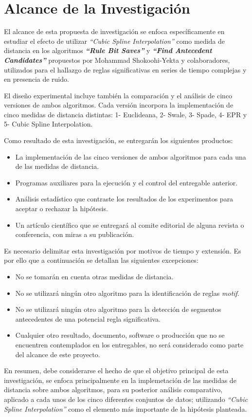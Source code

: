 \section{\textbf{Alcance de la Investigaci\'on}}
El alcance de esta propuesta de investigaci\'on se enfoca espec\'ificamente en estudiar el efecto de utilizar \textit{\enquote{Cubic Spline Interpolation}} como medida de distancia en los algoritmos \textit{\textbf{\enquote{Rule Bit Saves}}} y \textit{\textbf{\enquote{Find Antecedent Candidates}}} propuestos por Mohammad Shokoohi-Yekta y colaboradores, utilizados para el hallazgo de reglas significativas en series de tiempo complejas y en presencia de ruido.\par
El dise\~no experimental incluye tambi\'en la comparaci\'on y el an\'alisis de cinco versiones de ambos algoritmos. Cada versi\'on incorpora la implementaci\'on de cinco medidas de distancia distintas: 1- Euclideana, 2- Swale, 3- Spade, 4- EPR y 5- Cubic Spline Interpolation.\par
Como resultado de esta investigaci\'on, se entregar\'an los siguientes productos:
\begin{itemize}
\item La implementaci\'on de las cinco versiones de ambos algoritmos para cada una de las medidas de distancia.
\item Programas auxiliares para la ejecuci\'on y el control del entregable anterior.
\item An\'alisis estad\'istico que contraste los resultados de los experimentos para aceptar o rechazar la hip\'otesis.
\item Un art\'iculo cient\'ifico que se entregar\'a al comite editorial de alguna revista o conferencia, con miras a su publicaci\'on.
\end{itemize}
\par
Es necesario delimitar esta investigaci\'on por motivos de tiempo y extensi\'on. Es por ello que a continuaci\'on se detallan las siguientes excepciones:
\begin{itemize}
\item No se tomar\'an en cuenta otras medidas de distancia.
\item No se utilizar\'a ning\'un otro algoritmo para la identificaci\'on de reglas \textit{motif}.
\item No se utilizar\'a ning\'un otro algoritmo para la detecci\'on de segmentos antecedentes de una potencial regla significativa.
\item Cualquier otro resultado, documento, software o producci\'on que no se encuentren contemplados en los entregables, no ser\'a considerado como parte del alcance de este proyecto.
\end{itemize}
En resumen, debe considerarse el hecho de que el objetivo principal de esta investigaci\'on, se enfoca principalmente en la implemetaci\'on de las medidas de distancia sobre ambos algoritmos, para su posterior an\'alisis comparativo, aplicado a cada unos de los cinco diferentes conjuntos de datos; utilizando \textit{\enquote{Cubic Spline Interpolation}} como el elemento m\'as importante de la hip\'otesis planteada.
